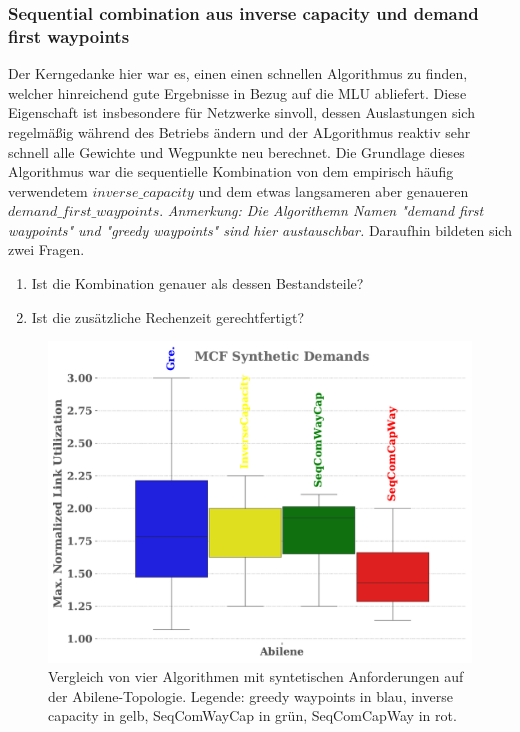 \documentclass[sigconf, nonacm, review]{acmart}
\begin{document}
\subsubsection{Sequential combination aus inverse capacity und demand first waypoints}
Der Kerngedanke hier war es, einen einen schnellen Algorithmus zu finden, 
welcher hinreichend gute Ergebnisse in Bezug auf die MLU abliefert.
Diese Eigenschaft ist insbesondere f\"ur Netzwerke sinvoll,
dessen Auslastungen sich regelm\"a\ss ig w\"ahrend des Betriebs \"andern und der ALgorithmus reaktiv sehr schnell alle Gewichte und Wegpunkte neu berechnet.\newline
Die Grundlage dieses Algorithmus war die sequentielle Kombination von dem empirisch h\"aufig verwendetem $inverse\_capacity$ und dem etwas langsameren aber genaueren $demand\_first\_waypoints$.
\emph{Anmerkung: Die Algorithemn Namen "demand first waypoints" und "greedy waypoints" sind hier austauschbar.}\newline
Daraufhin bildeten sich zwei Fragen.
\begin{enumerate}
    \item Ist die Kombination genauer als dessen Bestandsteile?
    \item Ist die zus\"atzliche Rechenzeit gerechtfertigt?
\end{enumerate}
\begin{figure}
\centering
\includegraphics[width=\linewidth]{figures/pouria_all_algorithms_abilene.pdf}
\caption{Vergleich von vier Algorithmen mit syntetischen Anforderungen auf der Abilene-Topologie. Legende: greedy waypoints in blau, inverse capacity in gelb, SeqComWayCap in gr\"un, SeqComCapWay in rot.}
\label{fig:pouriaBoxplotSynthetic}
\end{figure}
\end{document}
